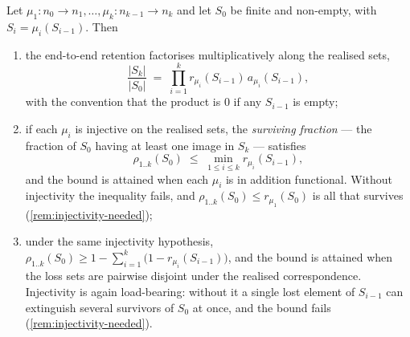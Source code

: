 \begin{theorem}
\label{thm:retention}
Let $\mu_1 : n_0 \to n_1, \dots, \mu_k : n_{k-1} \to n_k$ and let $S_0$ be
finite and non-empty, with $S_i = \mu_i(S_{i-1})$. Then
\begin{enumerate}[label=(\alph*),leftmargin=2.4em]
\item the end-to-end retention factorises multiplicatively along the realised
sets,
\[
\frac{|S_k|}{|S_0|}
\;=\;
\prod_{i=1}^{k} r_{\mu_i}(S_{i-1})\, a_{\mu_i}(S_{i-1}),
\]
with the convention that the product is $0$ if any $S_{i-1}$ is empty;
\item if each $\mu_i$ is injective on the realised sets, the \emph{surviving
fraction} --- the fraction of $S_0$ having at least one image in $S_k$ ---
satisfies
\[
\rho_{1..k}(S_0) \;\leq\; \min_{1 \leq i \leq k} r_{\mu_i}(S_{i-1}),
\]
and the bound is attained when each $\mu_i$ is in addition functional. Without
injectivity the inequality fails, and $\rho_{1..k}(S_0) \leq r_{\mu_1}(S_0)$ is
all that survives (\cref{rem:injectivity-needed});
\item under the same injectivity hypothesis,
$\rho_{1..k}(S_0) \geq 1 - \sum_{i=1}^{k}\bigl(1 - r_{\mu_i}(S_{i-1})\bigr)$,
and the bound is attained when the loss sets are pairwise disjoint under the
realised correspondence. Injectivity is again load-bearing: without it a single
lost element of $S_{i-1}$ can extinguish several survivors of $S_0$ at once, and
the bound fails (\cref{rem:injectivity-needed}).
\end{enumerate}
\end{theorem}

